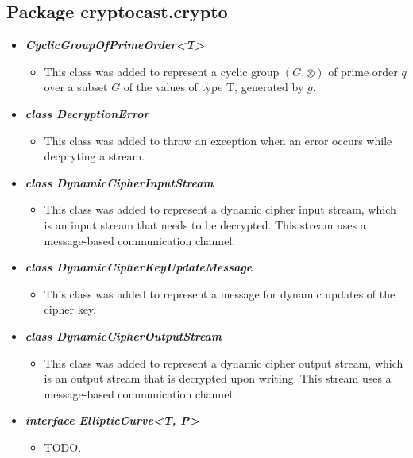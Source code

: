 \documentclass[a4paper,10pt]{scrartcl}
\begin{document}
	
\subsection{Package cryptocast.crypto}

\begin{itemize}
	
	
	 \item \textbf{\textit{CyclicGroupOfPrimeOrder<T>}}
	\begin{itemize}
	 \item This class was added to represent a cyclic group $(G, \otimes)$ of prime order $q$ over a subset 
    $G$ of the values of type T, generated by $g$.
	\end{itemize}
	
   \item \textit{\textbf{class DecryptionError}}
	\begin{itemize}
	 \item This class was added to throw an exception when an error occurs while decpryting a stream.
	\end{itemize}
	
	\item \textit{\textbf{class DynamicCipherInputStream}}
	\begin{itemize}
	 \item This class was added to represent a dynamic cipher input stream, which is an input stream that
	  needs to be decrypted. This stream uses a message-based communication channel.
	\end{itemize}
	
	\item \textit{\textbf{class DynamicCipherKeyUpdateMessage}}
	\begin{itemize}
	 \item This class was added to represent a message for dynamic updates of the cipher key.
	\end{itemize}
	
	\item \textit{\textbf{class DynamicCipherOutputStream}}
	\begin{itemize}
	 \item This class was added to represent a dynamic cipher output stream, which is an output stream 
	 that is decrypted upon writing. This stream uses a message-based communication channel.
	\end{itemize}
	
	\item \textit{\textbf{interface EllipticCurve<T, P>}}
	\begin{itemize}
	 \item TODO.
	\end{itemize}
	

\end{itemize}
\end{document}
